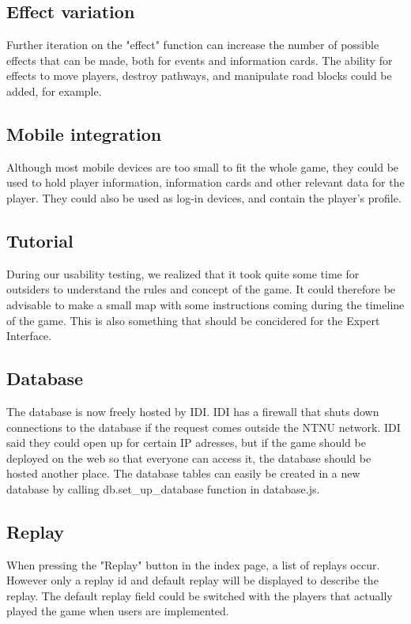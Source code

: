 \subsection{Effect variation}
Further iteration on the "effect" function can increase the number of possible effects that can be made, both for events and information cards. The ability for effects to move players, destroy pathways, and manipulate road blocks could be added, for example.\\

\subsection{Mobile integration}
Although most mobile devices are too small to fit the whole game, they could be used to hold player information, information cards and other relevant data for the player. They could also be used as log-in devices, and contain the player's profile.

\subsection{Tutorial} 
During our usability testing, we realized that it took quite some time for outsiders to understand the rules and concept of the game. It could therefore be advisable to make a small map with some instructions coming during the timeline of the game. This is also something that should be concidered for the Expert Interface. 

\subsection{Database}
The database is now freely hosted by IDI. IDI has a firewall that shuts down connections to the database if the request comes outside the NTNU network. IDI said they could open up for certain IP adresses, but if the game should be deployed on the web so that everyone can access it, the database should be hosted another place. The database tables can easily be created in a new database by calling db.set_up_database function in database.js.

\subsection{Replay}
When pressing the "Replay" button in the index page, a list of replays occur. However only a replay id and default replay will be displayed to describe the replay. The default replay field could be switched with the players that actually played the game when users are implemented.
